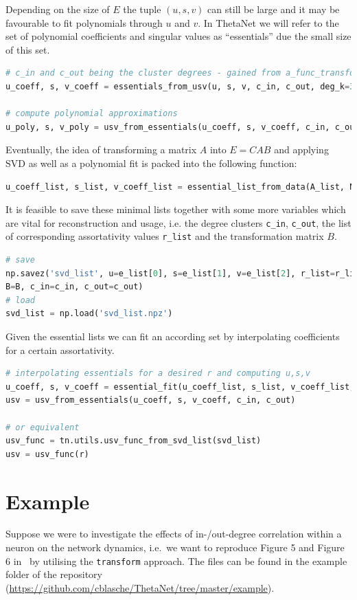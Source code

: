\documentclass[bibliography=totoc, twoside]{article}
\numberwithin{equation}{section}
\begin{document}
Depending on the size of $E$ the tuple $(u, s, v)$ can still be large and it may be favourable to fit polynomials through $u$ and $v$.
In ThetaNet we will refer to the set of polynomial coefficients and singular values as ``essentials'' due the small size of this set.
\begin{lstlisting}[language=python]
# c_in and c_out being the cluster degrees - gained from a_func_transform()
u_coeff, s, v_coeff = essentials_from_usv(u, s, v, c_in, c_out, deg_k=3)

# compute polynomial approximations
u_poly, s, v_poly = usv_from_essentials(u_coeff, s, v_coeff, c_in, c_out)
\end{lstlisting}
Eventually, the idea of transforming a matrix $A$ into $E=CAB$ and applying SVD as well as a polynomial fit is packed into the following function:
\begin{lstlisting}[language=python]
u_coeff_list, s_list, v_coeff_list = essential_list_from_data(A_list, N_c_in, N_c_out, deg_k=3, m=3, mapping='cumsum')
\end{lstlisting}
It is feasible to save these minimal lists together with some more variables which are vital for reconstruction and usage, i.e. the degree clusters \texttt{c\_in}, \texttt{c\_out}, the list of corresponding assortativity values \texttt{r\_list} and the transformation matrix $B$.
\begin{lstlisting}[language=python]
# save
np.savez('svd_list', u=e_list[0], s=e_list[1], v=e_list[2], r_list=r_list,
B=B, c_in=c_in, c_out=c_out)
# load
svd_list = np.load('svd_list.npz')
\end{lstlisting}
Given the essential lists we can fit an according set by interpolating coefficients for a certain assortativity.
\begin{lstlisting}[language=python]
# interpolating essentials for a desired r and computing u,s,v
u_coeff, s, v_coeff = essential_fit(u_coeff_list, s_list, v_coeff_list, r_list, r)
usv = usv_from_essentials(u_coeff, s, v_coeff, c_in, c_out)

# or equivalent
usv_func = tn.utils.usv_func_from_svd_list(svd_list)
usv = usv_func(r)
\end{lstlisting}


\section{Example}
Suppose we were to investigate the effects of in-/out-degree correlation within a neuron on the network dynamics, i.e.\ we want to reproduce Figure 5 and Figure 6 in~\cite{Laing2019} by utilising the \texttt{transform} approach.
The files can be found in the example folder of the repository (\url{https://github.com/cblasche/ThetaNet/tree/master/example}).
\end{document}
